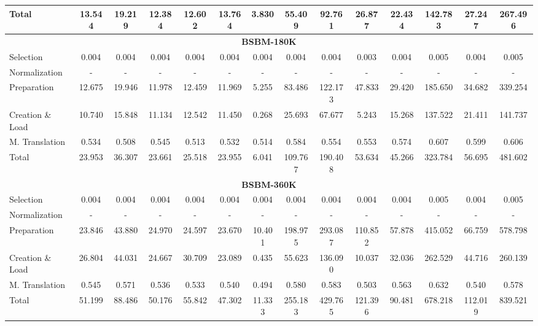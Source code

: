 \begin{table}[t]
{\begin{tabular}{l|c|c|c|c|c|c|c|c|c|c|c|c|c}
Total & 13.544 & 19.219 & 12.384 & 12.602 & 13.764 & 3.830 & 55.409 & 92.761 & 26.877 & 22.434 & 142.783 & 27.247 & 267.496 \\ \hline
\multicolumn{14}{c}{\textbf{BSBM-180K}} \\ \hline
Selection & 0.004 & 0.004 & 0.004 & 0.004 & 0.004 & 0.004 & 0.004 & 0.004 & 0.003 & 0.004 & 0.005 & 0.004 & 0.005 \\ \hline
Normalization & - & - & - & - & - & - & - & - & - & - & - & - & - \\ \hline
Preparation & 12.675 & 19.946 & 11.978 & 12.459 & 11.969 & 5.255 & 83.486 & 122.173 & 47.833 & 29.420 & 185.650 & 34.682 & 339.254 \\ \hline
Creation \& Load & 10.740 & 15.848 & 11.134 & 12.542 & 11.450 & 0.268 & 25.693 & 67.677 & 5.243 & 15.268 & 137.522 & 21.411 & 141.737 \\ \hline
M. Translation & 0.534 & 0.508 & 0.545 & 0.513 & 0.532 & 0.514 & 0.584 & 0.554 & 0.553 & 0.574 & 0.607 & 0.599 & 0.606 \\ \hline
Total & 23.953 & 36.307 & 23.661 & 25.518 & 23.955 & 6.041 & 109.767 & 190.408 & 53.634 & 45.266 & 323.784 & 56.695 & 481.602 \\ \hline
\multicolumn{14}{c}{\textbf{BSBM-360K}} \\ \hline
Selection & 0.004 & 0.004 & 0.004 & 0.004 & 0.004 & 0.004 & 0.004 & 0.004 & 0.004 & 0.004 & 0.005 & 0.004 & 0.005 \\ \hline
Normalization & - & - & - & - & - & - & - & - & - & - & - & - & - \\ \hline
Preparation & 23.846 & 43.880 & 24.970 & 24.597 & 23.670 & 10.401 & 198.975 & 293.087 & 110.852 & 57.878 & 415.052 & 66.759 & 578.798 \\ \hline
Creation \& Load & 26.804 & 44.031 & 24.667 & 30.709 & 23.089 & 0.435 & 55.623 & 136.090 & 10.037 & 32.036 & 262.529 & 44.716 & 260.139 \\ \hline
M. Translation & 0.545 & 0.571 & 0.536 & 0.533 & 0.540 & 0.494 & 0.580 & 0.583 & 0.503 & 0.563 & 0.632 & 0.540 & 0.578 \\ \hline
Total & 51.199 & 88.486 & 50.176 & 55.842 & 47.302 & 11.333 & 255.183 & 429.765 & 121.396 & 90.481 & 678.218 & 112.019 & 839.521 \\ \hline
\end{tabular}%
}
\end{table}

